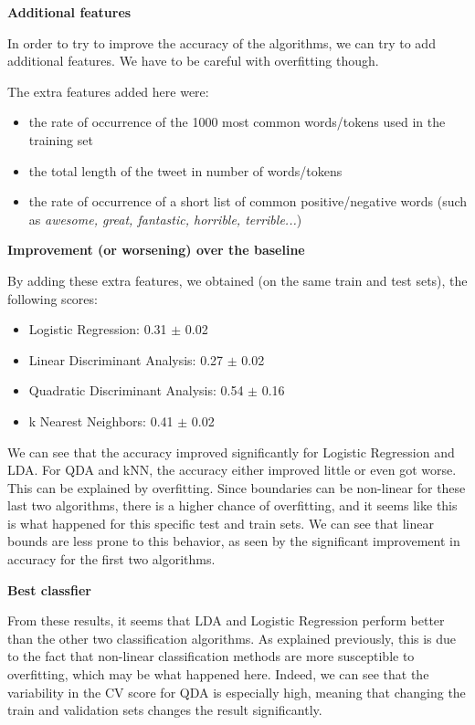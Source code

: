 \documentclass[]{article}
\begin{document}
\textbf{Additional features}

In order to try to improve the accuracy of the algorithms, we can try to add additional features. We have to be careful with overfitting though. 

The extra features added here were:

\begin{itemize}
  \item the rate of occurrence of the 1000 most common words/tokens used in the training set
  \item the total length of the tweet in number of words/tokens
  \item the rate of occurrence of a short list of common positive/negative words (such as \textit{awesome, great, fantastic, horrible, terrible...})
\end{itemize}

\textbf{Improvement (or worsening) over the baseline}

By adding these extra features, we obtained (on the same train and test sets), the following scores:

\begin{itemize}
  \item Logistic Regression: 0.31 $\pm$ 0.02
  \item Linear Discriminant Analysis: 0.27 $\pm$ 0.02
  \item Quadratic Discriminant Analysis: 0.54 $\pm$ 0.16
  \item k Nearest Neighbors: 0.41 $\pm$ 0.02
\end{itemize}

We can see that the accuracy improved significantly for Logistic Regression and LDA. For QDA and kNN, the accuracy either improved little or even got worse. This can be explained by overfitting. Since boundaries can be non-linear for these last two algorithms, there is a higher chance of overfitting, and it seems like this is what happened for this specific test and train sets. We can see that linear bounds are less prone to this behavior, as seen by the significant improvement in accuracy for the first two algorithms.


\textbf{Best classfier}

From these results, it seems that LDA and Logistic Regression perform better than the other two classification algorithms. As explained previously, this is due to the fact that non-linear classification methods are more susceptible to overfitting, which may be what happened here. Indeed, we can see that the variability in the CV score for QDA is especially high, meaning that changing the train and validation sets changes the result significantly.
\end{document}
